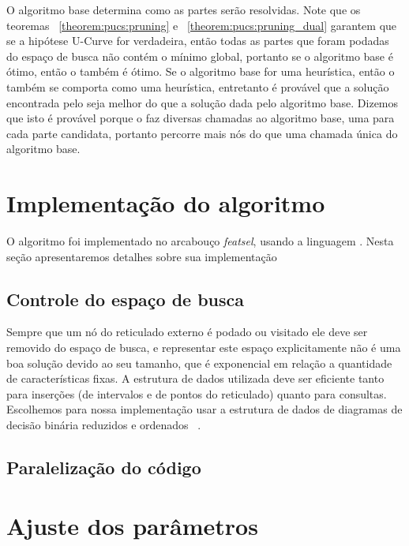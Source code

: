 O algoritmo base determina como as partes serão resolvidas. Note que os 
teoremas ~\ref{theorem:pucs:pruning} e ~\ref{theorem:pucs:pruning_dual}
garantem que se a hipótese U-Curve for verdadeira, então todas as partes
que foram podadas do espaço de busca não contém o mínimo global, 
portanto se o algoritmo base é ótimo, então o  também é
ótimo. Se o algoritmo base for uma heurística, então o 
também se comporta como uma heurística, entretanto é provável que a 
solução encontrada pelo  seja melhor do que a solução 
dada pelo algoritmo base. Dizemos que isto é provável porque o 
 faz diversas chamadas ao algoritmo base, uma para cada
parte candidata, portanto percorre mais nós do que uma chamada única do
algoritmo base.

\section{Implementação do algoritmo}
O algoritmo  foi implementado no arcabouço \emph{featsel},
usando a linguagem . Nesta seção apresentaremos detalhes
sobre sua implementação 

\subsection{Controle do espaço de busca}
Sempre que um nó do reticulado externo é podado ou visitado ele deve ser
removido do espaço de busca, e representar este espaço explicitamente 
não é uma boa solução devido ao seu tamanho, que é exponencial em 
relação a quantidade de características fixas. A estrutura de dados 
utilizada deve ser eficiente tanto para inserções (de intervalos e de 
pontos do reticulado) quanto para consultas. Escolhemos para nossa 
implementação usar a estrutura de dados de diagramas de decisão binária
reduzidos e ordenados ~\cite{Bry86}.


\subsection{Paralelização do código}

\section{Ajuste dos parâmetros}


